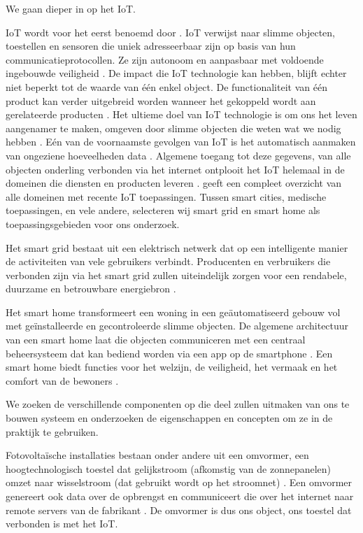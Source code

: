 \documentclass{hogent-article}
\begin{document}
    We gaan dieper in op het IoT.
    
    IoT wordt voor het eerst benoemd door \textcite{Ashton2009}. IoT verwijst naar slimme objecten, toestellen en sensoren die uniek adresseerbaar zijn op basis van hun communicatieprotocollen. Ze zijn autonoom en aanpasbaar met voldoende ingebouwde veiligheid \autocite{Shafique2020}. De impact die IoT technologie kan hebben, blijft echter niet beperkt tot de waarde van één enkel object. De functionaliteit van één product kan verder uitgebreid worden wanneer het gekoppeld wordt aan gerelateerde producten \autocite{Wortmann2015}. Het ultieme doel van IoT technologie is om ons het leven aangenamer te maken, omgeven door slimme objecten die weten wat we nodig hebben \autocite{Kassab2020}. Eén van de voornaamste gevolgen van IoT is het automatisch aanmaken van ongeziene hoeveelheden data \autocite{Gubbi2013} \autocite{Kassab2020}. Algemene toegang tot deze gegevens, van alle objecten onderling verbonden via het internet ontplooit het IoT helemaal in de domeinen die diensten en producten leveren \autocite{Gubbi2013}. \textcite{Kassab2020} geeft een compleet overzicht van alle domeinen met recente IoT toepassingen. Tussen smart cities, medische toepassingen, en vele andere, selecteren wij smart grid en smart home als toepassingsgebieden voor ons onderzoek.
    
    Het smart grid bestaat uit een elektrisch netwerk dat op een intelligente manier de activiteiten van vele gebruikers verbindt. Producenten en verbruikers die verbonden zijn via het smart grid zullen uiteindelijk zorgen voor een rendabele, duurzame en betrouwbare energiebron \autocite{Kassab2020} .
    
    Het smart home transformeert een woning in een geäutomatiseerd gebouw vol met geïnstalleerde en gecontroleerde slimme objecten. De algemene architectuur van een smart home laat die objecten communiceren met een centraal beheersysteem dat kan bediend worden via een app op de smartphone \autocite{Kassab2020}. Een smart home biedt functies voor het welzijn, de veiligheid, het vermaak en het comfort van de bewoners \autocite{Choi2021}.

    We zoeken de verschillende componenten op die deel zullen uitmaken van ons te bouwen systeem en onderzoeken de eigenschappen en concepten om ze in de praktijk te gebruiken.
    
    Fotovoltaïsche installaties bestaan onder andere uit een omvormer, een hoogtechnologisch toestel dat gelijkstroom (afkomstig van de zonnepanelen) omzet naar wisselstroom (dat gebruikt wordt op het stroomnet) \autocite{Teodorescu2011}. Een omvormer genereert ook data over de opbrengst en communiceert die over het internet naar remote servers van de fabrikant \autocite{Fusionsolar2021}. De omvormer is dus ons object, ons toestel dat verbonden is met het IoT.
    
\end{document}

